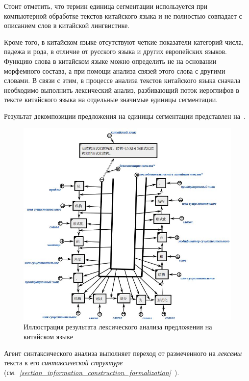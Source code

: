 Стоит отметить, что термин единица сегментации используется при компьютерной обработке текстов китайского языка и не полностью совпадает с описанием слов в китайской лингвистике.

Кроме того, в китайском языке отсутствуют четкие показатели категорий числа, падежа и рода, в отличие от русского языка и других европейских языков.
Функцию слова в китайском языке можно определить не на основании морфемного состава, а при помощи анализа связей этого слова с другими словами.
В связи с этим, в процессе анализа текстов китайского языка сначала необходимо выполнить лексический анализ, разбивающий поток иероглифов в тексте китайского языка на отдельные значимые единицы сегментации.

Результат декомпозиции предложения на единицы сегментации представлен на~\textit{}.

\begin{figure}[H]
	\centering
	\includegraphics[scale=0.6]{images/part4/chapter_chinese/segment_chinese_sentence}
	\caption{Иллюстрация результата лексического анализа предложения на китайском языке}
	\label{fig:segment-chinese}
\end{figure}

Агент синтаксического анализа выполняет переход от размеченного на \textit{лексемы} текста к его \textit{синтаксической структуре} (см.~\textit{\ref{section_information_construction_formalization}~}).

